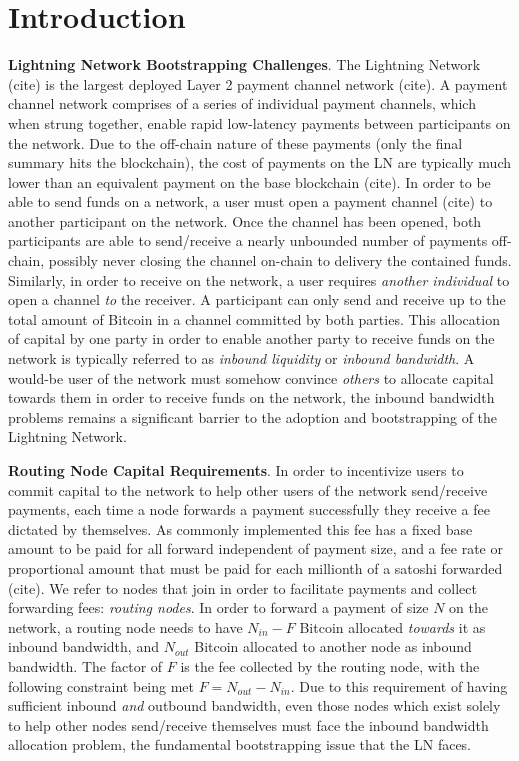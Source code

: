 \documentclass[12pt,a4paper]{article}
\theoremstyle{definition}
\begin{document}
\section{Introduction}

\textbf{Lightning Network Bootstrapping Challenges}. The Lightning Network
(cite) is the largest deployed Layer 2 payment channel network (cite). A
payment channel network comprises of a series of individual payment channels,
which when strung together, enable rapid low-latency payments between
participants on the network. Due to the off-chain nature of these payments
(only the final summary hits the blockchain), the cost of payments on the LN
are typically much lower than an equivalent payment on the base blockchain
(cite). In order to be able to send funds on a network, a user must open a
payment channel (cite) to another participant on the network. Once the channel
has been opened, both participants are able to send/receive a nearly unbounded
number of payments off-chain, possibly never closing the channel on-chain to
delivery the contained funds. Similarly, in order to receive on the network, a
user requires \emph{another individual} to open a channel \emph{to} the
receiver. A participant can only send and receive up to the total amount of
Bitcoin in a channel committed by both parties. This allocation of capital by
one party in order to enable another party to receive funds on the network is
typically referred to as \emph{inbound liquidity} or \emph{inbound bandwidth}.
A would-be user of the network must somehow convince \emph{others} to allocate
capital towards them in order to receive funds on the network, the inbound
bandwidth problems remains a significant barrier to the adoption and
bootstrapping of the Lightning Network. 

\textbf{Routing Node Capital Requirements}.  In order to incentivize users to
commit capital to the network to help other users of the network send/receive
payments, each time a node forwards a payment successfully they receive a fee
dictated by themselves. As commonly implemented this fee has a fixed base
amount to be paid for all forward independent of payment size, and a fee rate
or proportional amount that must be paid for each millionth of a satoshi
forwarded (cite). We refer to nodes that join in order to facilitate payments
and collect forwarding fees: \emph{routing nodes}. In order to forward a
payment of size $N$ on the network, a routing node needs to have $N_{in} - F$
Bitcoin allocated \emph{towards} it as inbound bandwidth, and $N_{out}$ Bitcoin
allocated to another node as inbound bandwidth. The factor of $F$ is the fee
collected by the routing node, with the following constraint being met $F =
N_{out} - N_{in}$. Due to this requirement of having sufficient inbound
\emph{and} outbound bandwidth, even those nodes which exist solely to help
other nodes send/receive themselves must face the inbound bandwidth allocation
problem, the fundamental bootstrapping issue that the LN faces. 
\end{document}
